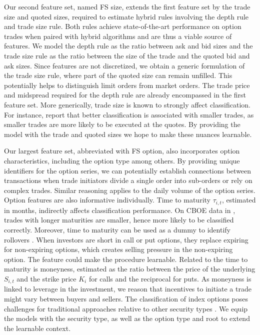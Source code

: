 Our second feature set, named \gls{FS} size, extends the first feature set by the trade size and quoted sizes, required to estimate hybrid rules involving the depth rule and trade size rule. Both rules achieve state-of-the-art performance on option trades when paired with hybrid algorithms and are thus a viable source of features. We model the depth rule as the ratio between ask and bid sizes and the trade size rule as the ratio between the size of the trade and the quoted bid and ask sizes. Since features are not discretized, we obtain a generic formulation of the trade size rule, where part of the quoted size can remain unfilled. This potentially helps to distinguish limit orders from market orders. The trade price and midspread required for the depth rule are already encompassed in the first feature set. More generically, trade size is known to strongly affect classification. For instance, \textcites[][889]{savickasInferringDirectionOption2003}[][537]{ellisAccuracyTradeClassification2000} report that better classification is associated with smaller trades, as smaller trades are more likely to be executed at the quotes. By providing the model with the trade and quoted sizes we hope to make these nuances learnable.

Our largest feature set, abbreviated with \gls{FS} option, also incorporates option characteristics, including the option type among others. By providing unique identifiers for the option series, we can potentially establish connections between transactions when trade initiators divide a single order into sub-orders or rely on complex trades. Similar reasoning applies to the daily volume of the option series. Option features are also informative individually. Time to maturity $\tau_{i,t}$, estimated in months, indirectly affects classification performance. On \gls{CBOE} data in \textcite[][889]{savickasInferringDirectionOption2003}, trades with longer maturities are smaller, hence more likely to be classified correctly. Moreover, time to maturity can be used as a dummy to identify rollovers \autocite[][700]{muravyevOrderFlowExpected2016}. When investors are short in call or put options, they replace expiring for non-expiring options, which creates selling pressure in the non-expiring option. The feature could make the procedure learnable. Related to the time to maturity is moneyness, estimated as the ratio between the price of the underlying $S_{i,t}$ and the strike price $K_{i}$ for calls and the reciprocal for puts. As moneyness is linked to leverage in the investment, we reason that incentives to initiate a trade might vary between buyers and sellers. The classification of index options poses challenges for traditional approaches relative to other security types \autocites[][22]{grauerOptionTradeClassification2022}[][898-899]{savickasInferringDirectionOption2003}. We equip the models with the security type, as well as the option type and root to extend the learnable context.

